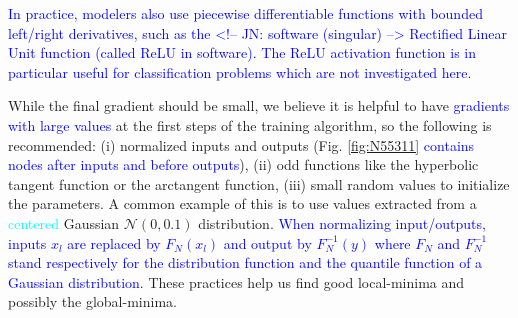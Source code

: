 \textcolor{blue}{In practice, modelers also use piecewise differentiable functions
with bounded left/right derivatives, such as the 
<!-- JN: software (singular) -->
Rectified Linear Unit function (called ReLU in software).
The ReLU activation function is in particular useful for classification problems
which are not investigated here.}

While the final gradient should be small, we believe it is helpful to
have \textcolor{blue}{gradients with large values} at the first steps of
the training algorithm, so the following is recommended: (i) normalized
inputs and outputs (Fig. \ref{fig:N55311}
\textcolor{blue}{contains  nodes after inputs and before outputs}),
(ii) odd functions like the hyperbolic tangent function or the
arctangent function, (iii) small random values to initialize the
parameters. A common example of this is to use values extracted from a
\textcolor{cyan}{centered} Gaussian \(\mathcal N(0, 0.1)\) distribution.
\textcolor{blue}{When normalizing input/outputs, inputs $x_l$ are replaced
by $F_N(x_l)$ and output by $F_N^{-1}(y)$ where $F_N$ and $F_N^{-1}$
stand respectively for the distribution function and the quantile function
of a Gaussian distribution.} These practices help us find good
local-minima and possibly the global-minima.

